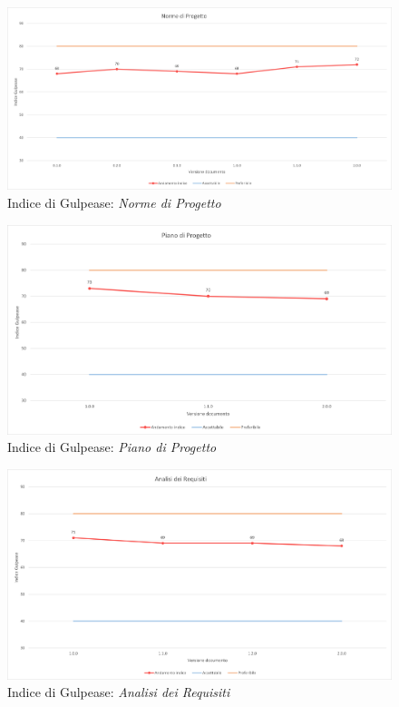 \pagebreak
{}
\begin{figure}[!ht]
    \caption{Indice di Gulpease: \textit{Norme di Progetto}}
    \vspace{10px}
    \includegraphics[scale=0.5]{sezioni/immagini/NormeGulpease.png}
    \centering
\end{figure}
\pagebreak
\begin{figure}[!ht]
    \caption{Indice di Gulpease: \textit{Piano di Progetto}}
    \vspace{10px}
    \includegraphics[scale=0.5]{sezioni/immagini/PianoProgettoGulpease.png}
    \centering
\end{figure}

\begin{figure}[!ht]
    \caption{Indice di Gulpease: \textit{Analisi dei Requisiti}}
    \vspace{10px}
    \includegraphics[scale=0.5]{sezioni/immagini/AnalisiGulpease.png}
    \centering
\end{figure}

